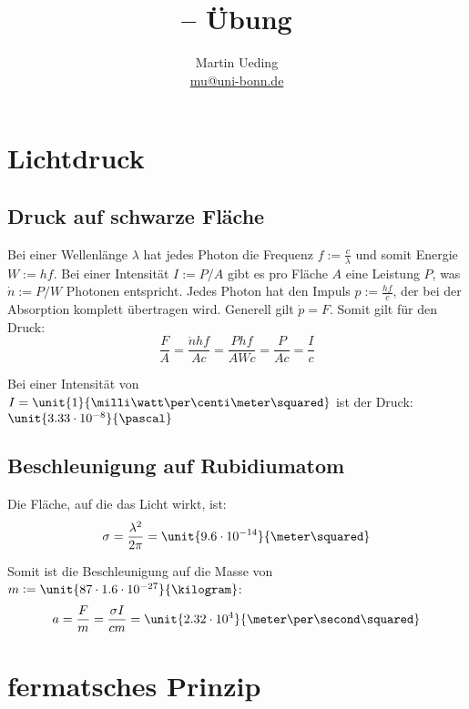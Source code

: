 \documentclass[11pt, ngerman]{article}
\title{\themodul{} -- Übung \theuebung \\ \vspace{0.5cm} \large{\thegruppe}}
\author{Martin Ueding \\ \small{\href{mailto:mu@uni-bonn.de}{mu@uni-bonn.de}}}
\newcommand{\e}[1]{\cdot 10^{#1}}
\begin{document}
\maketitle


\section{Lichtdruck}

\subsection{Druck auf schwarze Fläche}

Bei einer Wellenlänge $\lambda$ hat jedes Photon die Frequenz $f := \frac c
\lambda$ und somit Energie $W := h f$. Bei einer Intensität $I := P/A$ gibt es
pro Fläche $A$ eine Leistung $P$, was $\dot n := P / W$ Photonen entspricht.
Jedes Photon hat den Impuls $p := \frac{hf}{c}$, der bei der Absorption
komplett übertragen wird. Generell gilt $\dot p = F$. Somit gilt für den Druck:
\[
	\frac FA = \frac{\dot n h f}{A c} = \frac{P h f}{A W c} = \frac{P}{A c} = \frac{I}{c}
\]

Bei einer Intensität von $I = \unit{1}{\milli \watt \per \centi \meter
\squared}$ ist der Druck: $\unit{3.33 \e{-8}}{\pascal}$

\subsection{Beschleunigung auf Rubidiumatom}

Die Fläche, auf die das Licht wirkt, ist:
\[ \sigma = \frac{\lambda^2}{2 \pi} = \unit{9.6\e{-14}}{\meter \squared} \]

Somit ist die Beschleunigung auf die Masse von $m := \unit{87 \cdot 1.6\e{-27}}{\kilogram}$:
\[ a = \frac Fm = \frac{\sigma I}{cm} = \unit{2.32\e4}{\meter \per \second \squared} \]


\section{fermatsches Prinzip}
\end{document}
